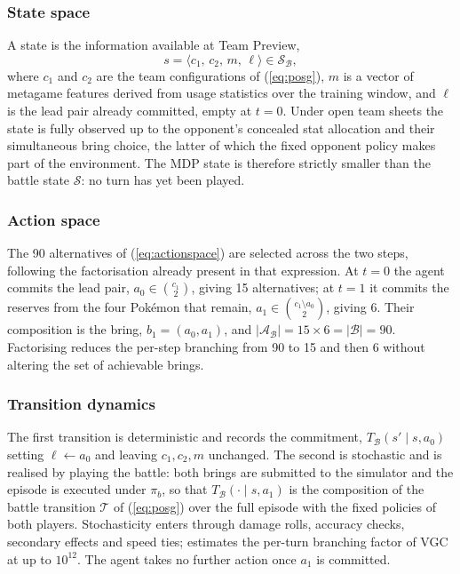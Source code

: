 \documentclass[conference]{IEEEtran}
\begin{document}
\subsubsection{State space}
A state is the information available at Team Preview,
\begin{equation}
s = \langle c_1,\, c_2,\, m,\, \ell \rangle \in \mathcal{S}_{\mathcal{B}},
\end{equation}
\noindent where $c_1$ and $c_2$ are the team configurations of
(\ref{eq:posg}), $m$ is a vector of metagame features derived from usage
statistics over the training window, and $\ell$ is the lead pair already
committed, empty at $t=0$. Under open team sheets the state is fully observed
up to the opponent's concealed stat allocation and their simultaneous bring choice,
the latter of which the fixed opponent policy makes part of the environment.
The MDP state is therefore strictly smaller than the battle state
$\mathcal{S}$: no turn has yet been played.

\subsubsection{Action space}
The 90 alternatives of (\ref{eq:actionspace}) are selected across the two
steps, following the factorisation already present in that expression. At
$t=0$ the agent commits the lead pair,
$a_0 \in \binom{c_1}{2}$, giving 15 alternatives; at $t=1$ it commits the
reserves from the four Pok\'emon that remain,
$a_1 \in \binom{c_1 \setminus a_0}{2}$, giving 6. Their composition is the
bring, $b_1 = (a_0, a_1)$, and
$|\mathcal{A}_{\mathcal{B}}| = 15 \times 6 = |\mathcal{B}| = 90$. Factorising
reduces the per-step branching from 90 to 15 and then 6 without altering the
set of achievable brings.

\subsubsection{Transition dynamics}
The first transition is deterministic and records the commitment,
$T_{\mathcal{B}}(s' \mid s, a_0)$ setting $\ell \leftarrow a_0$ and leaving
$c_1, c_2, m$ unchanged. The second is stochastic and is realised by playing
the battle: both brings are submitted to the simulator and the episode is
executed under $\pi_b$, so that $T_{\mathcal{B}}(\cdot \mid s, a_1)$ is the
composition of the battle transition $\mathcal{T}$ of (\ref{eq:posg}) over the
full episode with the fixed policies of both players. Stochasticity enters
through damage rolls, accuracy checks, secondary effects and speed ties;
\cite{angliss2026} estimates the per-turn branching factor of VGC at up to
$10^{12}$. The agent takes no further action once $a_1$ is committed.
\end{document}
